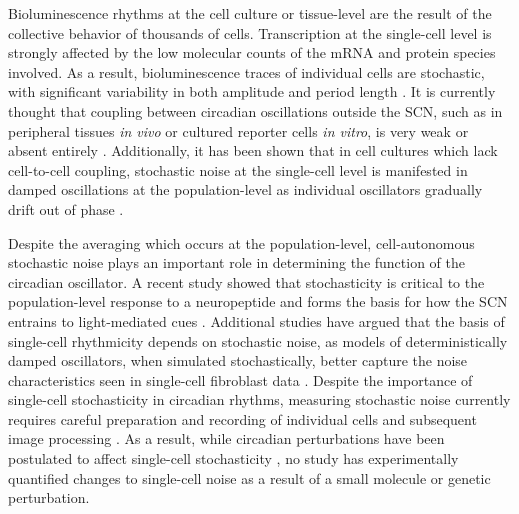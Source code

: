 \documentclass[11pt, letterpaper]{article}
\begin{document}
Bioluminescence rhythms at the cell culture or tissue-level are the result of the collective behavior of thousands of cells.
Transcription at the single-cell level is strongly affected by the low molecular counts of the mRNA and protein species involved. 
As a result, bioluminescence traces of individual cells are stochastic, with significant variability in both amplitude and period length \cite{Welsh2004}. 
It is currently thought that coupling between circadian oscillations outside the SCN, such as in peripheral tissues {\itshape in vivo} or cultured reporter cells {\itshape in vitro}, is very weak or absent entirely \cite{Guenthner2014, Noguchi2013}.
Additionally, it has been shown that in cell cultures which lack cell-to-cell coupling, stochastic noise at the single-cell level is manifested in damped oscillations at the population-level as individual oscillators gradually drift out of phase \cite{Nagoshi2004, Welsh2004}. 

Despite the averaging which occurs at the population-level, cell-autonomous stochastic noise plays an important role in determining the function of the circadian oscillator.
A recent study showed that stochasticity is critical to the population-level response to a neuropeptide and forms the basis for how the SCN entrains to light-mediated cues \cite{An2013}.
Additional studies have argued that the basis of single-cell rhythmicity depends on stochastic noise, as models of deterministically damped oscillators, when simulated stochastically, better capture the noise characteristics seen in single-cell fibroblast data \cite{Westermark2009}.
Despite the importance of single-cell stochasticity in circadian rhythms, measuring stochastic noise currently requires careful preparation and recording of individual cells and subsequent image processing \cite{Leise2012}. 
As a result, while circadian perturbations have been postulated to affect single-cell stochasticity \cite{Rougemont2007}, no study has experimentally quantified changes to single-cell noise as a result of a small molecule or genetic perturbation.
\end{document}
